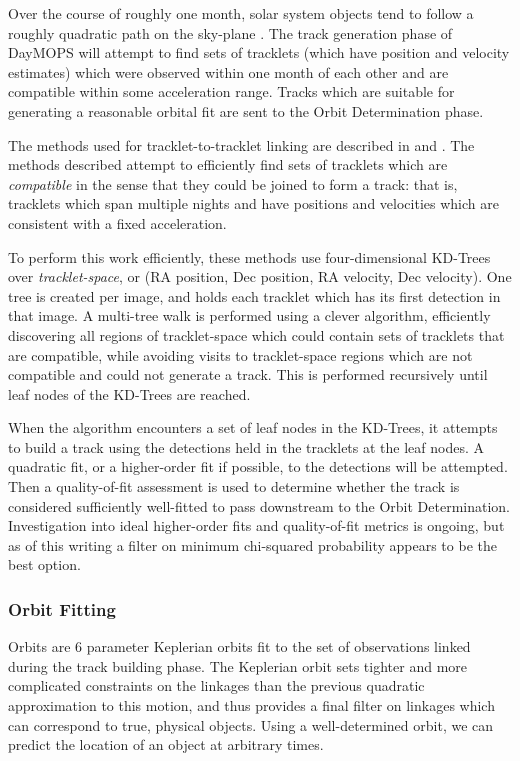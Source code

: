 \documentclass[12pt,preprint]{aastex}
\begin{document}
Over the course of roughly one month, solar system objects tend to
follow a roughly quadratic path on the sky-plane
\citep{kubica_thesis}.  The track generation phase of DayMOPS will
attempt to find sets of tracklets (which have position and velocity
estimates) which were observed within one month of each other and are
compatible within some acceleration range.  Tracks which are
suitable for generating a reasonable orbital fit are sent to the Orbit
Determination phase.

The methods used for tracklet-to-tracklet linking are described in
\citet{kubica_thesis} and \citet{Kubica:2005:MTA:1081870.1081889}.
The methods described attempt to efficiently find sets of tracklets
which are \textit{compatible} in the sense that they could be joined
to form a track: that is, tracklets which span multiple nights and
have positions and velocities which are consistent with a fixed
acceleration.  

To perform this work efficiently, these methods use four-dimensional
KD-Trees over \textit{tracklet-space}, or (RA position, Dec position,
RA velocity, Dec velocity). One tree is created per image, and holds
each tracklet which has its first detection in that image.  A
multi-tree walk is performed using a clever algorithm, efficiently
discovering all regions of tracklet-space which could contain sets of
tracklets that are compatible, while avoiding visits to tracklet-space
regions which are not compatible and could not generate a track.  This
is performed recursively until leaf nodes of the KD-Trees are reached.


When the algorithm encounters a set of leaf nodes in the KD-Trees, it
attempts to build a track using the detections held in the tracklets
at the leaf nodes.  A quadratic fit, or a higher-order fit if
possible, to the detections will be attempted.  Then a quality-of-fit
assessment is used to determine whether the track is considered
sufficiently well-fitted to pass downstream to the Orbit
Determination.  Investigation into ideal higher-order fits and
quality-of-fit metrics is ongoing, but as of this writing a filter on
minimum chi-squared probability appears to be the best option.


\subsubsection{Orbit Fitting}
\label{orbitFitting}

Orbits are 6 parameter Keplerian orbits fit to the set of observations
linked during the track building phase. The Keplerian orbit sets
tighter and more complicated constraints on the linkages than the
previous quadratic approximation to this motion, and thus provides a
final filter on linkages which can correspond to true, physical
objects. Using a well-determined orbit, we can predict the location of
an object at arbitrary times.
\end{document}

